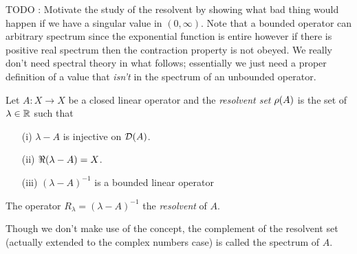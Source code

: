 TODO : Motivate the study of the resolvent by showing what bad thing would happen if we have a singular value in $(0,\infty)$.  Note that a bounded operator can arbitrary spectrum since the exponential function is entire however if there is positive real spectrum then the contraction property is not obeyed.  We really don't need spectral theory in what follows; essentially we just need a proper definition of a value that \emph{isn't} in the spectrum of an unbounded operator.

\begin{defn}Let $A : X \to X$ be a closed linear operator and the \emph{resolvent set} $\rho(A)$ is the set of $\lambda \in \mathbb{R}$ such that
\begin{itemize}
\item[(i)] $\lambda - A$ is injective on $\mathcal{D}(A)$.
\item[(ii)] $\Re(\lambda - A) = X$.
\item[(iii)] $(\lambda -A)^{-1}$ is a bounded linear operator
\end{itemize}
The operator $R_\lambda = (\lambda -A)^{-1}$ the \emph{resolvent} of $A$.
\end{defn}
Though we don't make use of the concept, the complement of the resolvent set (actually extended to the complex numbers case) is called the spectrum of $A$.

